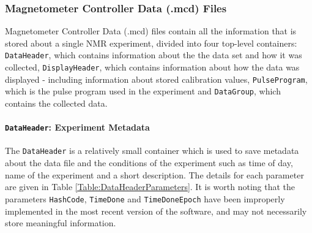 \documentclass[PaulGanssle-Thesis.tex]{subfiles}
\begin{document}
\subsubsection{Magnetometer Controller Data (.mcd) Files}
\label{console.software.bin.mcd}
Magnetometer Controller Data (.mcd) files contain all the information that is stored about a single NMR experiment, divided into four top-level containers: \texttt{DataHeader}, which contains information about the the data set and how it was collected, \texttt{DisplayHeader}, which contains information about how the data was displayed - including information about stored calibration values, \texttt{PulseProgram}, which is the pulse program used in the experiment and \texttt{DataGroup}, which contains the collected data.

\paragraph{\texttt{DataHeader}: Experiment Metadata}
\label{Section:DataHeader}
The \texttt{DataHeader} is a relatively small container which is used to save metadata about the data file and the conditions of the experiment such as time of day, name of the experiment and a short description. The details for each parameter are given in Table \ref{Table:DataHeaderParameters}. It is worth noting that the parameters \texttt{HashCode}, \texttt{TimeDone} and \texttt{TimeDoneEpoch} have been improperly implemented in the most recent version of the software, and may not necessarily store meaningful information.
\end{document}
